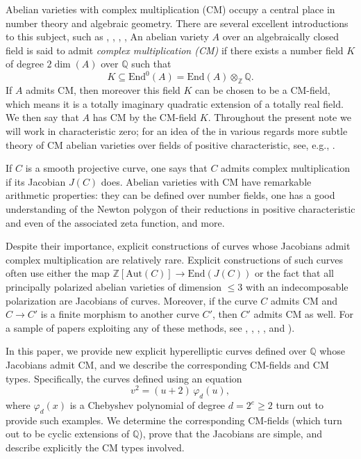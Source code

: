 \documentclass[a4paper,12pt]{amsart}
\newcommand{\ZZ}{{\mathbb Z}}
\newcommand{\QQ}{{\mathbb Q}}
\numberwithin{equation}{section}
\theoremstyle{plain}
\numberwithin{thm}{section}
\begin{document}
Abelian varieties with complex multiplication (CM) occupy a central place in number theory and algebraic geometry. There are several excellent introductions to this subject,
such as \cite{ST}, \cite[Section~13.3]{BL}, \cite{Milne}, \cite{Lang}, An abelian variety $A$ over an algebraically closed field is said to admit \emph{complex multiplication (CM)} if there exists a number field $K$ of degree $2\dim(A)$ over $\QQ$ such that
\[
    K \subseteq \textrm{End}^0(A)=\textrm{End}(A)\otimes_\ZZ\QQ.
\]
If $A$ admits CM, then moreover this field $K$ can be chosen
to be a CM-field, which means it is a totally imaginary
quadratic extension of a totally real field. We then say
that $A$ has CM by the CM-field $K$. Throughout the
present note we will work in characteristic zero; for
an idea of the in various regards more subtle theory of
CM abelian varieties over fields of positive characteristic,
see, e.g., \cite{Oort}.

If $C$ is a smooth projective curve, one says that $C$ admits complex multiplication if its Jacobian $J(C)$ does.  Abelian varieties with CM have remarkable arithmetic properties: they can be defined over number fields, one has a good understanding of the Newton polygon of their reductions in
positive characteristic and even of the associated zeta function, and more.

Despite their importance, explicit constructions of curves whose Jacobians admit complex multiplication are relatively rare. 
Explicit constructions of such curves often use either the
map $\ZZ[\textrm{Aut}(C)]\to\textrm{End}(J(C))$ or the
fact that all principally polarized abelian varieties
of dimension $\leq 3$ with an indecomposable polarization
are Jacobians of curves. Moreover, if the curve $C$ admits
CM and $C\to C'$ is a finite morphism to another curve $C'$, then $C'$ admits CM as well. For a sample of papers
exploiting any
of these methods, see \cite{Ion}, \cite{BILV}, \cite{TTV}, \cite{CLR}, \cite{CMKT} and \cite[Theorem~5.2.10]{van}).

In this paper, we provide new explicit hyperelliptic curves 
defined over $\QQ$ whose Jacobians admit CM, and we
describe the corresponding CM-fields and CM types. Specifically, the curves defined using an equation
\[
v^2 = (u+2)\,\varphi_d(u),
\]
where $\varphi_d(x)$ is a Chebyshev polynomial of degree $d=2^e\geq 2$ turn out to provide such examples. 
We determine the corresponding CM-fields (which turn out to be
cyclic extensions of $\QQ$), prove that the Jacobians are 
simple, and describe explicitly the CM types involved. 
\end{document}
